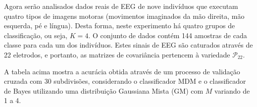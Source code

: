 \documentclass[a4paper,titlepage]{article}
\begin{document}
\begin{center}
  \vspace{1em}
  \vspace{1em}
\end{center}

Agora serão analisados dados reais de EEG de nove indivíduos que executam
quatro tipos de imagens motoras (movimentos imaginados da mão direita, mão
esquerda, pé e língua). Desta forma, neste experimento há quatro grupos de
classificação, ou seja, $K=4$. O conjunto de dados contém 144 amostras de cada
classe para cada um dos indivíduos. Estes sinais de EEG são caturados através
de 22 eletrodos, e portanto, as matrizes de covariância pertencem à variedade
$\mathcal{P}_{22}$.

\begin{center}
  \vspace{1em}
  \vspace{1em}
\end{center}

A tabela acima mostra a acurácia obtida através de um processo de validação
cruzada com 30 subdivisões, considerando o classificador MDM e o classificador
de Bayes utilizando uma distribuição Gaussiana Mista (GM) com $M$ variando de 1
a 4.
\end{document}
